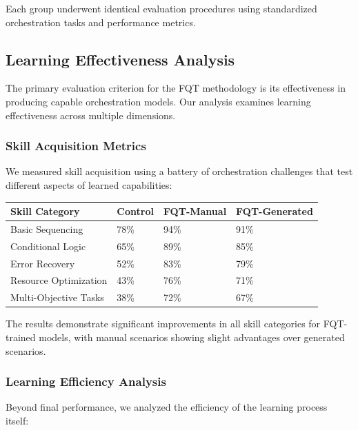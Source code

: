 Each group underwent identical evaluation procedures using standardized orchestration tasks and performance metrics.

\subsection*{Learning Effectiveness Analysis}

The primary evaluation criterion for the FQT methodology is its effectiveness in producing capable orchestration models. Our analysis examines learning effectiveness across multiple dimensions.

\subsubsection*{Skill Acquisition Metrics}

We measured skill acquisition using a battery of orchestration challenges that test different aspects of learned capabilities:

\begin{center}
\begin{tabular}{@{}llll@{}}
\toprule
\textbf{Skill Category} & \textbf{Control} & \textbf{FQT-Manual} & \textbf{FQT-Generated} \\
\midrule
Basic Sequencing & 78\% & 94\% & 91\% \\
Conditional Logic & 65\% & 89\% & 85\% \\
Error Recovery & 52\% & 83\% & 79\% \\
Resource Optimization & 43\% & 76\% & 71\% \\
Multi-Objective Tasks & 38\% & 72\% & 67\% \\
\bottomrule
\end{tabular}
\end{center}

The results demonstrate significant improvements in all skill categories for FQT-trained models, with manual scenarios showing slight advantages over generated scenarios.

\subsubsection*{Learning Efficiency Analysis}

Beyond final performance, we analyzed the efficiency of the learning process itself:


